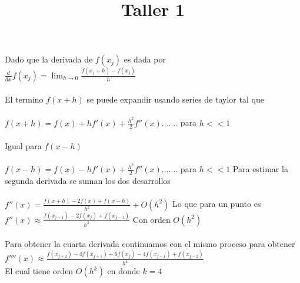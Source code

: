 \documentclass[12pt, letterpaper]{article}
\title{Taller 1}
\begin{document}
Dado que la derivada de $f(x_j)$ es dada por \\
$\frac{d}{dx}f(x_j)=\lim_{h \to 0} \frac{f(x_j+h)-f(x_j)}{h}
$\\\\
El termino $f(x+h)$ se puede expandir usando series de taylor tal que\\\\
$
f(x+h)=f(x)+hf'(x)+\frac{h^2}{2}f''(x).......$ para $h<<1
$\\\\
Igual para $f(x-h)$\\\\
$
f(x-h)=f(x)-hf'(x)+\frac{h^2}{2}f''(x).......$ para $h<<1
$
Para estimar la segunda derivada se suman los dos desarrollos\\\\
$f''(x)=\frac{f(x+h)-2f(x)+f(x-h)}{h^2}+O(h^2)$ Lo que para un punto es \\$f''(x)\approx\frac{f(x_{j+1})-2f(x_j)+f(x_{j-1})}{h^2}$ Con orden $O(h^2)
$\\\\

Para obtener la cuarta derivada continuamos con el mismo proceso para obtener
$
f''''(x)\approx\frac{f(x_{j+2})-4f(x_{j+1})+6f(x_j)-4f(x_{j-1})+f(x_{j-2})}{h^4}
$\\
El cual tiene orden $O(h^k)$ en donde $k=4$
\end{document}
